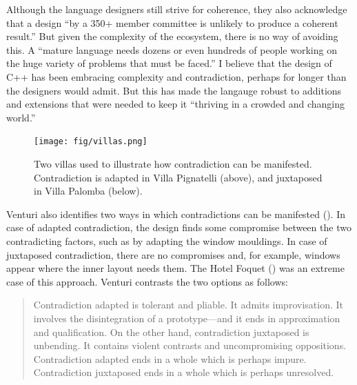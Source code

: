 Although the language designers still strive for coherence, they also acknowledge that
a design ``by a 350+ member committee is unlikely to produce a coherent result.'' But given
the complexity of the ecosystem, there is no way of avoiding this. A  ``mature language needs
dozens or even hundreds of people working on the huge variety of problems that must be
faced.'' I believe that the
design of C++ has been embracing complexity and contradiction, perhaps for longer than the
designers would admit. But this has made the langauge robust to additions and extensions that
were needed to keep it ``thriving in a crowded and changing world.''


\begin{figure}
\centering
\begin{minipage}[t]{.5\textwidth}%
\vspace{0em}
\raggedleft
\vspace{-1em}
\texttt{[image: fig/villas.png]}
\end{minipage}\quad\quad
\begin{minipage}[t]{.4\textwidth}
\caption{Two villas used to illustrate how contradiction can be manifested. Contradiction is
  adapted in Villa Pignatelli (above), and juxtaposed in Villa Palomba (below).}
\label{fig:villas}
\end{minipage}
\end{figure}

Venturi also identifies two ways in which contradictions can be manifested ().
In case of adapted contradiction, the design finds some compromise between the two contradicting
factors, such as by adapting the window mouldings. In case of juxtaposed contradiction, there are
no compromises and, for example, windows appear where the inner layout needs them. The Hotel
Foquet () was an extreme case of this approach. Venturi contrasts the two
options as follows:

\begin{quote}
Contradiction adapted is tolerant and pliable. It admits improvisation. It involves the
disintegration of a prototype---and it ends in approximation and qualification. On the other
hand, contradiction juxtaposed is unbending. It contains violent contrasts and uncompromising
oppositions. Contradiction adapted ends in a whole which is perhaps impure. Contradiction
juxtaposed ends in a whole which is perhaps unresolved.
\end{quote}


